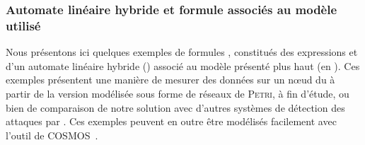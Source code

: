         \subsubsection{Automate linéaire hybride et formule \lsah associés au modèle utilisé}
Nous présentons ici quelques exemples de formules \lsah, constitués des expressions \lsah et d'un automate linéaire hybride (\alh) associé au modèle \rpsge présenté plus haut (en ).
Ces exemples présentent une manière de mesurer des données sur un nœud du \rc à partir de la version modélisée sous forme de réseaux de \textsc{Petri}, à fin d'étude, ou bien de comparaison de notre solution avec d'autres systèmes de détection des attaques par \dds.
Ces exemples peuvent en outre être modélisés facilement avec l'outil de \modelchecking \textsf{COSMOS}~\cite{BDDHP11cosmos}.

